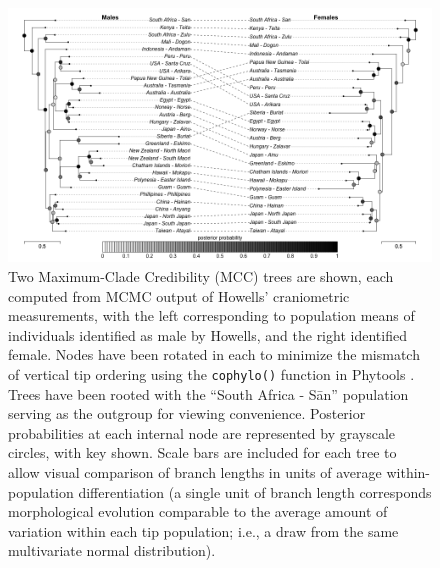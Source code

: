 \begin{figure}[h]
\centering
\includegraphics[width=160mm]{figures/howellsTreesMF.png}
\caption[Maximum Clade Credibility Trees for Empirical Analyses of Howells' Data]{Two Maximum-Clade Credibility (MCC) trees are shown, each computed from MCMC output of Howells’ craniometric measurements, with the left corresponding to population means of individuals identified as male by Howells, and the right identified female. Nodes have been rotated in each to minimize the mismatch of vertical tip ordering using the \texttt{cophylo()} function in Phytools \citep{revellPhytoolsPackagePhylogenetic2012}. Trees have been rooted with the “South Africa - Sān” population serving as the outgroup for viewing convenience. Posterior probabilities at each internal node are represented by grayscale circles, with key shown. Scale bars are included for each tree to allow visual comparison of branch lengths in units of average within-population differentiation (a single unit of branch length corresponds morphological evolution comparable to the average amount of variation within each tip population; i.e., a draw from the same multivariate normal distribution).
\label{overflow}
\label{fig:mccCophylo}
}
\end{figure}

